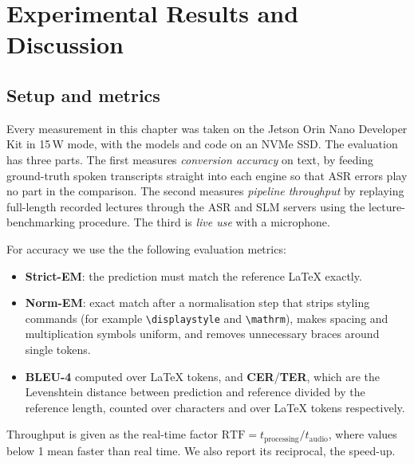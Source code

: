 \documentclass[11pt,a4paper,oneside]{report}
\theoremstyle{definition}
\newcommand{\RTF}{\mathrm{RTF}}
\begin{document}
\chapter{Experimental Results and Discussion}
\label{chap:results}

\section{Setup and metrics}
Every measurement in this chapter was taken on the Jetson Orin Nano Developer Kit in 15\,W mode, with the models and code on an NVMe SSD. The evaluation has three parts. The first measures \emph{conversion accuracy} on text, by feeding ground-truth spoken transcripts straight into each engine so that ASR errors play no part in the comparison. The second measures \emph{pipeline throughput} by replaying full-length recorded lectures through the ASR and SLM servers using the lecture-benchmarking procedure. The third is \emph{live use} with a microphone.

For accuracy we use the the following evaluation metrics:
\begin{itemize}
  \item \textbf{Strict-EM}: the prediction must match the reference LaTeX exactly.
  \item \textbf{Norm-EM}: exact match after a normalisation step that strips styling commands (for example \texttt{\textbackslash displaystyle} and \texttt{\textbackslash mathrm}), makes spacing and multiplication symbols uniform, and removes unnecessary braces around single tokens.
  \item \textbf{BLEU-4} computed over LaTeX tokens, and \textbf{CER}/\textbf{TER}, which are the Levenshtein distance between prediction and reference divided by the reference length, counted over characters and over LaTeX tokens respectively.
\end{itemize}
Throughput is given as the real-time factor $\RTF = t_{\text{processing}}/t_{\text{audio}}$, where values below 1 mean faster than real time. We also report its reciprocal, the speed-up.
\end{document}
